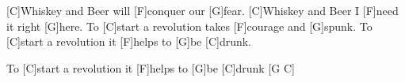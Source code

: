 \begin{guitar}
	\begin{highlightbar}
		 
		[C]Whiskey and Beer will [F]conquer our [G]fear.
		[C]Whiskey and Beer I [F]need it right [G]here.
		To [C]start a revolution takes [F]courage and [G]spunk.
		To [C]start a revolution it [F]helps to [G]be [C]drunk.
	\end{highlightbar}
	
	To [C]start a revolution it [F]helps to [G]be [C]drunk [G C]{}
\end{guitar}